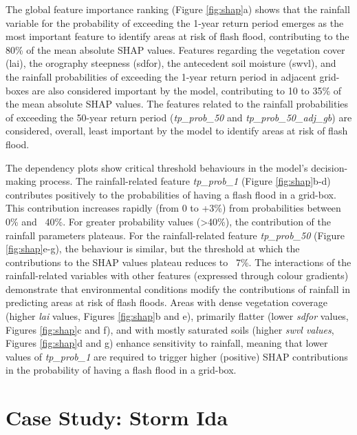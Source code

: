 \documentclass[nhess, manuscript]{copernicus}
\begin{document}
The global feature importance ranking (Figure \ref{fig:shap}a) shows that the rainfall variable for the probability of exceeding the 1-year return period emerges as the most important feature to identify areas at risk of flash flood, contributing to the 80\% of the mean absolute SHAP values. Features regarding the vegetation cover (lai), the orography steepness (sdfor), the antecedent soil moisture (swvl), and the rainfall probabilities of exceeding the 1-year return period in adjacent grid-boxes are also considered important by the model, contributing to 10 to 35\% of the mean absolute SHAP values. The features related to the rainfall probabilities of exceeding the 50-year return period (\textit{tp\_prob\_50} and \textit{tp\_prob\_50\_adj\_gb}) are considered, overall, least important by the model to identify areas at risk of flash flood. 

The dependency plots show critical threshold behaviours in the model's decision-making process. The rainfall-related feature \textit{tp\_prob\_1} (Figure \ref{fig:shap}b-d) contributes positively to the probabilities of having a flash flood in a grid-box. This contribution increases rapidly (from 0 to +3\%) from probabilities between 0\% and ~40\%. For greater probability values (>40\%), the contribution of the rainfall parameters plateaus. For the rainfall-related feature \textit{tp\_prob\_50} (Figure \ref{fig:shap}e-g), the behaviour is similar, but the threshold at which the contributions to the SHAP values plateau reduces to ~7\%. The interactions of the rainfall-related variables with other features (expressed through colour gradients) demonstrate that environmental conditions modify the contributions of rainfall in predicting areas at risk of flash floods. Areas with dense vegetation coverage (higher \textit{lai} values, Figures \ref{fig:shap}b and e), primarily flatter (lower \textit{sdfor} values, Figures \ref{fig:shap}c and f), and with mostly saturated soils (higher \textit{swvl values}, Figures \ref{fig:shap}d and g) enhance sensitivity to rainfall, meaning that lower values of \textit{tp\_prob\_1} are required to trigger higher (positive) SHAP contributions in the probability of having a flash flood in a grid-box.


\section{Case Study: Storm Ida}
\label{flash_flood_focused_verification_rainfall_based_ff_CASE_STUDY}
\end{document}
